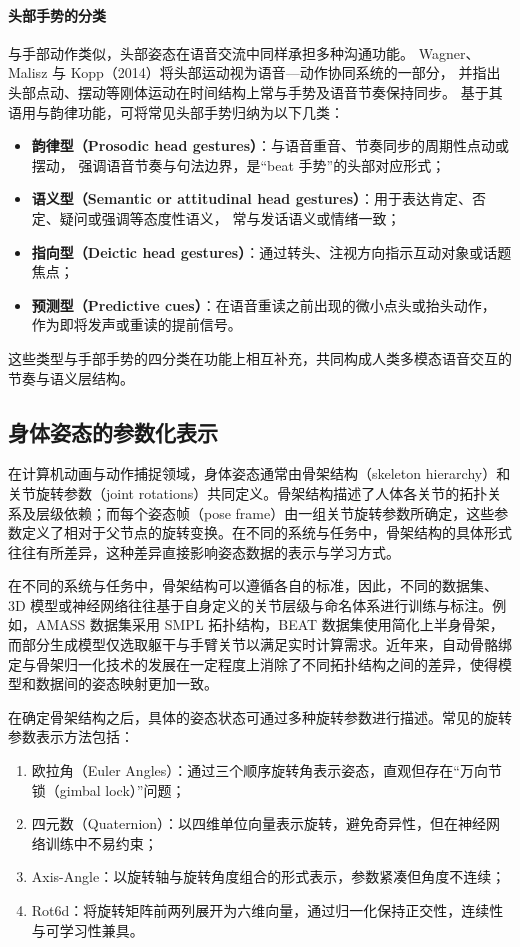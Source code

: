 \paragraph{头部手势的分类}
与手部动作类似，头部姿态在语音交流中同样承担多种沟通功能。
Wagner、Malisz 与 Kopp（2014）\cite{gesture_and_speech_in_interaction}将头部运动视为语音—动作协同系统的一部分，
并指出头部点动、摆动等刚体运动在时间结构上常与手势及语音节奏保持同步。
基于其语用与韵律功能，可将常见头部手势归纳为以下几类：
\begin{itemize}
  \item \textbf{韵律型（Prosodic head gestures）}：与语音重音、节奏同步的周期性点动或摆动，
        强调语音节奏与句法边界，是“beat 手势”的头部对应形式；
  \item \textbf{语义型（Semantic or attitudinal head gestures）}：用于表达肯定、否定、疑问或强调等态度性语义，
        常与发话语义或情绪一致；
  \item \textbf{指向型（Deictic head gestures）}：通过转头、注视方向指示互动对象或话题焦点；
  \item \textbf{预测型（Predictive cues）}：在语音重读之前出现的微小点头或抬头动作，
        作为即将发声或重读的提前信号\cite{busso2007rigidheadmotion}。
\end{itemize}
这些类型与手部手势的四分类在功能上相互补充，共同构成人类多模态语音交互的节奏与语义层结构。

\subsection{身体姿态的参数化表示}
在计算机动画与动作捕捉领域，身体姿态通常由骨架结构（skeleton hierarchy）和关节旋转参数（joint rotations）共同定义。骨架结构描述了人体各关节的拓扑关系及层级依赖；而每个姿态帧（pose frame）由一组关节旋转参数所确定，这些参数定义了相对于父节点的旋转变换。在不同的系统与任务中，骨架结构的具体形式往往有所差异，这种差异直接影响姿态数据的表示与学习方式。

在不同的系统与任务中，骨架结构可以遵循各自的标准，因此，不同的数据集、3D 模型或神经网络往往基于自身定义的关节层级与命名体系进行训练与标注。例如，AMASS 数据集采用 SMPL 拓扑结构，BEAT 数据集使用简化上半身骨架，而部分生成模型仅选取躯干与手臂关节以满足实时计算需求。近年来，自动骨骼绑定与骨架归一化技术的发展在一定程度上消除了不同拓扑结构之间的差异，使得模型和数据间的姿态映射更加一致。

在确定骨架结构之后，具体的姿态状态可通过多种旋转参数进行描述。常见的旋转参数表示方法包括：

\begin{enumerate}
\item 欧拉角（Euler Angles）：通过三个顺序旋转角表示姿态，直观但存在“万向节锁（gimbal lock）”问题；
\item 四元数（Quaternion）：以四维单位向量表示旋转，避免奇异性，但在神经网络训练中不易约束；
\item Axis-Angle：以旋转轴与旋转角度组合的形式表示，参数紧凑但角度不连续；
\item Rot6d\cite{rot6d}：将旋转矩阵前两列展开为六维向量，通过归一化保持正交性，连续性与可学习性兼具。
\end{enumerate}

